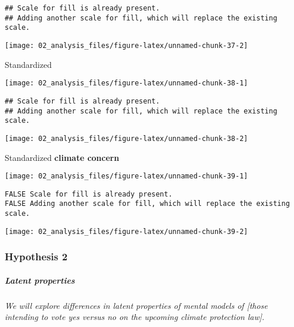 \documentclass[
]{article}
\begin{document}
\begin{verbatim}
## Scale for fill is already present.
## Adding another scale for fill, which will replace the existing scale.
\end{verbatim}

\begin{center}\texttt{[image: 02\_analysis\_files/figure-latex/unnamed-chunk-37-2]} \end{center}

Standardized

\begin{center}\texttt{[image: 02\_analysis\_files/figure-latex/unnamed-chunk-38-1]} \end{center}

\begin{verbatim}
## Scale for fill is already present.
## Adding another scale for fill, which will replace the existing scale.
\end{verbatim}

\begin{center}\texttt{[image: 02\_analysis\_files/figure-latex/unnamed-chunk-38-2]} \end{center}

Standardized \textbf{climate concern }

\begin{center}\texttt{[image: 02\_analysis\_files/figure-latex/unnamed-chunk-39-1]} \end{center}

\begin{verbatim}
FALSE Scale for fill is already present.
FALSE Adding another scale for fill, which will replace the existing scale.
\end{verbatim}

\begin{center}\texttt{[image: 02\_analysis\_files/figure-latex/unnamed-chunk-39-2]} \end{center}

\hypertarget{hypothesis-2}{%
\subsubsection{Hypothesis 2}\label{hypothesis-2}}

\hypertarget{latent-properties}{%
\subparagraph{Latent properties}\label{latent-properties}}

\emph{We will explore differences in latent properties of mental models
of {[}those intending to vote yes versus no on the upcoming climate
protection law{]}. }
\end{document}

